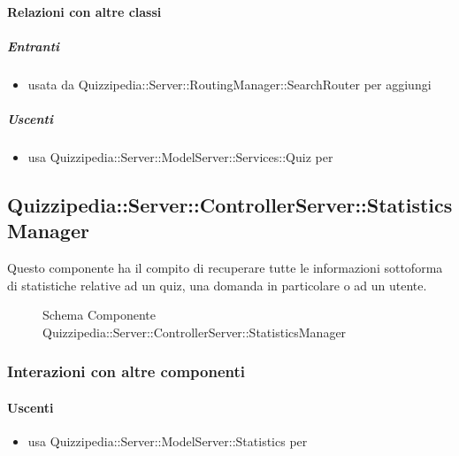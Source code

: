 \paragraph{Relazioni con altre classi}
\subparagraph{Entranti}
\begin{itemize}
\item usata da Quizzipedia::Server::RoutingManager::SearchRouter per aggiungi
\end{itemize}
\subparagraph{Uscenti}
\begin{itemize}
\item usa Quizzipedia::Server::ModelServer::Services::Quiz per 
\end{itemize}
\subsection{Quizzipedia::Server::ControllerServer::StatisticsManager}
Questo componente ha il compito di recuperare tutte le informazioni sottoforma di statistiche relative ad un quiz, una domanda in particolare o ad un utente.
\begin{figure}[H]
\centering
\noindent{}
\caption[Schema Componente Quizzipedia::Server::ControllerServer::StatisticsManager]{Schema Componente Quizzipedia::Server::ControllerServer::StatisticsManager}
\end{figure}
\subsubsection{Interazioni con altre componenti}
\paragraph{Uscenti}
\begin{itemize}
\item usa Quizzipedia::Server::ModelServer::Statistics per 
\end{itemize}
